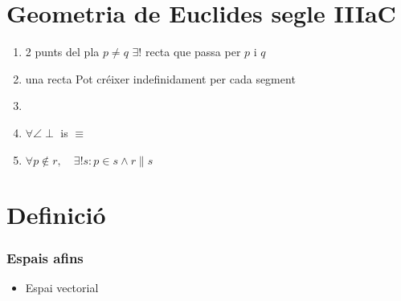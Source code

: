 \documentclass[a4paper,10pt]{article}
\newcommand{\red}[1]{{\color{red}#1}}
\begin{document}
\tableofcontents
\part{Geometria de Euclides segle IIIaC}
\begin{enumerate}
\item 2 punts del pla
	\subitem $p \neq q$
	\subitem $\exists !$ recta que passa per $p$ i $q$
\item una recta
	\subitem Pot créixer indefinidament per cada segment
\item \phantom{Doncs no ho ha dit res}
\item $\forall \angle \perp$ is $\equiv$
\item $\forall p \notin r, \quad \exists ! s: p \in s \wedge r \parallel s$
\end{enumerate}

\part{\red{D}efinició}
\section{Espais afins}
\begin{itemize}
\item Espai vectorial
\end{itemize}
\end{document}
